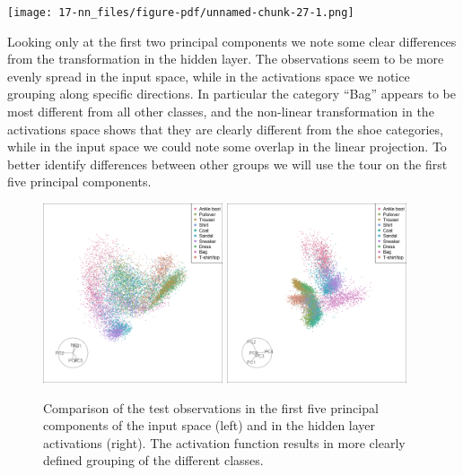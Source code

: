 \documentclass[
  letterpaper,
]{krantz}
\begin{document}
\texttt{[image: 17-nn\_files/figure-pdf/unnamed-chunk-27-1.png]}

Looking only at the first two principal components we note some clear
differences from the transformation in the hidden layer. The
observations seem to be more evenly spread in the input space, while in
the activations space we notice grouping along specific directions. In
particular the category ``Bag'' appears to be most different from all
other classes, and the non-linear transformation in the activations
space shows that they are clearly different from the shoe categories,
while in the input space we could note some overlap in the linear
projection. To better identify differences between other groups we will
use the tour on the first five principal components.

\begin{figure}

\begin{minipage}{0.50\linewidth}

\includegraphics[width=2.08333in,height=\textheight]{images/fashion_images_gt_36.png}

\end{minipage}%
%
\begin{minipage}{0.50\linewidth}

\includegraphics[width=2.08333in,height=\textheight]{images/fashion_activation_gt_126.png}

\end{minipage}%
\newline
\begin{minipage}{0.50\linewidth}
Comparison of the test observations in the first five principal
components of the input space (left) and in the hidden layer activations
(right). The activation function results in more clearly defined
grouping of the different classes.\end{minipage}%

\end{figure}%
\end{document}

